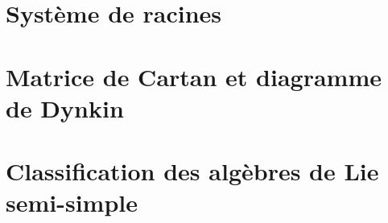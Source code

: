 
\section{Système de racines}

\section{Matrice de Cartan et diagramme de Dynkin}

\section{Classification des algèbres de Lie semi-simple}
